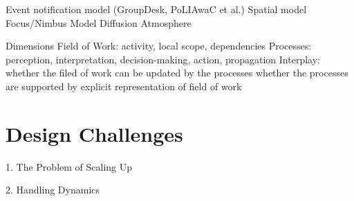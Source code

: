 Event notification model (GroupDesk, PoLIAwaC et al.)
Spatial model
Focus/Nimbus Model
Diffusion
Atmosphere

Dimensions
Field of Work: activity, local scope, dependencies
Processes: perception, interpretation, decision-making, action, propagation
Interplay: 
whether the filed of work can be updated by the processes
whether the processes are supported by explicit representation of field of work


\section{Design Challenges} %
\label{sec:design_challenges}
1. The Problem of Scaling Up

2. Handling Dynamics









 

